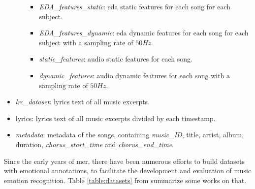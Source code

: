 \begin{itemize}
\begin{itemize}
\begin{itemize}
			\item \textit{EDA\_features\_static}: \gls{eda} static features for each song for each subject.
			\item \textit{EDA\_features\_dynamic}: \gls{eda} dynamic features for each song for each subject with a sampling rate of $50Hz$.
		\end{itemize}
		\begin{itemize}
			\item \textit{static\_features}: audio static features for each song.
			\item \textit{dynamic\_features}: audio dynamic features for each song with a sampling rate of $50Hz$.
		\end{itemize}
	\end{itemize}
	\item \textit{lrc\_dataset}: lyrics text of all music excerpts.
	\item lyrics:  lyrics text of all music excerpts divided by each timestamp.
	\item \textit{metadata}: metadata of the songs, containing \textit{music\_ID}, title, artist, album, duration, \textit{chorus\_start\_time} and \textit{chorus\_end\_time}.
\end{itemize}
\newpage
Since the early years of \gls{mer}, there have been numerous efforts to build datasets with emotional annotations, to facilitate the development and evaluation of music emotion recognition. Table \ref{table:datasets} from \cite{zhang2018pmemo} summarize some works on that.
